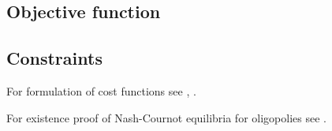 \subsection{Objective function}

\subsection{Constraints}

For formulation of cost functions see \cite{Bergman1995}, \cite{Pineau2003}.	

For existence proof of Nash-Cournot equilibria for oligopolies see \cite{Murphy1982}.



